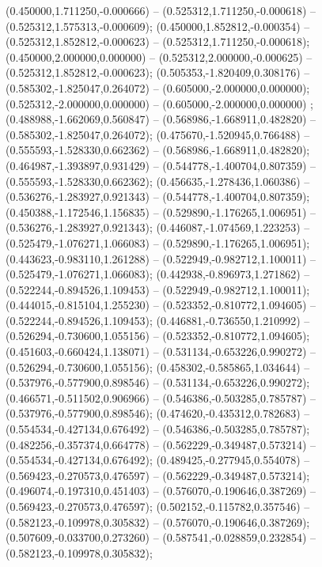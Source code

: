  (0.450000,1.711250,-0.000666) -- (0.525312,1.711250,-0.000618) -- (0.525312,1.575313,-0.000609);
 (0.450000,1.852812,-0.000354) -- (0.525312,1.852812,-0.000623) -- (0.525312,1.711250,-0.000618);
 (0.450000,2.000000,0.000000) -- (0.525312,2.000000,-0.000625) -- (0.525312,1.852812,-0.000623);
 (0.505353,-1.820409,0.308176) -- (0.585302,-1.825047,0.264072) -- (0.605000,-2.000000,0.000000);
 (0.525312,-2.000000,0.000000) -- (0.605000,-2.000000,0.000000) ;
 (0.488988,-1.662069,0.560847) -- (0.568986,-1.668911,0.482820) -- (0.585302,-1.825047,0.264072);
 (0.475670,-1.520945,0.766488) -- (0.555593,-1.528330,0.662362) -- (0.568986,-1.668911,0.482820);
 (0.464987,-1.393897,0.931429) -- (0.544778,-1.400704,0.807359) -- (0.555593,-1.528330,0.662362);
 (0.456635,-1.278436,1.060386) -- (0.536276,-1.283927,0.921343) -- (0.544778,-1.400704,0.807359);
 (0.450388,-1.172546,1.156835) -- (0.529890,-1.176265,1.006951) -- (0.536276,-1.283927,0.921343);
 (0.446087,-1.074569,1.223253) -- (0.525479,-1.076271,1.066083) -- (0.529890,-1.176265,1.006951);
 (0.443623,-0.983110,1.261288) -- (0.522949,-0.982712,1.100011) -- (0.525479,-1.076271,1.066083);
 (0.442938,-0.896973,1.271862) -- (0.522244,-0.894526,1.109453) -- (0.522949,-0.982712,1.100011);
 (0.444015,-0.815104,1.255230) -- (0.523352,-0.810772,1.094605) -- (0.522244,-0.894526,1.109453);
 (0.446881,-0.736550,1.210992) -- (0.526294,-0.730600,1.055156) -- (0.523352,-0.810772,1.094605);
 (0.451603,-0.660424,1.138071) -- (0.531134,-0.653226,0.990272) -- (0.526294,-0.730600,1.055156);
 (0.458302,-0.585865,1.034644) -- (0.537976,-0.577900,0.898546) -- (0.531134,-0.653226,0.990272);
 (0.466571,-0.511502,0.906966) -- (0.546386,-0.503285,0.785787) -- (0.537976,-0.577900,0.898546);
 (0.474620,-0.435312,0.782683) -- (0.554534,-0.427134,0.676492) -- (0.546386,-0.503285,0.785787);
 (0.482256,-0.357374,0.664778) -- (0.562229,-0.349487,0.573214) -- (0.554534,-0.427134,0.676492);
 (0.489425,-0.277945,0.554078) -- (0.569423,-0.270573,0.476597) -- (0.562229,-0.349487,0.573214);
 (0.496074,-0.197310,0.451403) -- (0.576070,-0.190646,0.387269) -- (0.569423,-0.270573,0.476597);
 (0.502152,-0.115782,0.357546) -- (0.582123,-0.109978,0.305832) -- (0.576070,-0.190646,0.387269);
 (0.507609,-0.033700,0.273260) -- (0.587541,-0.028859,0.232854) -- (0.582123,-0.109978,0.305832);

